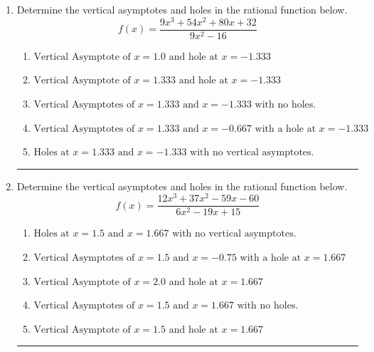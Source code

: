 \documentclass[14pt]{extbook}
\newcommand{\litem}[1]{\item#1\hspace*{-1cm}\rule{\textwidth}{0.4pt}}
\begin{document}
\begin{enumerate}
{\begin{enumerate}[label=\Alph*.]
\end{enumerate} }
\litem{
Determine the vertical asymptotes and holes in the rational function below.\[ f(x) = \frac{9x^{3} +54 x^{2} +80 x + 32}{9x^{2} -16} \]\begin{enumerate}[label=\Alph*.]
\item \( \text{Vertical Asymptote of } x = 1.0 \text{ and hole at } x = -1.333 \)
\item \( \text{Vertical Asymptote of } x = 1.333 \text{ and hole at } x = -1.333 \)
\item \( \text{Vertical Asymptotes of } x = 1.333 \text{ and } x = -1.333 \text{ with no holes.} \)
\item \( \text{Vertical Asymptotes of } x = 1.333 \text{ and } x = -0.667 \text{ with a hole at } x = -1.333 \)
\item \( \text{Holes at } x = 1.333 \text{ and } x = -1.333 \text{ with no vertical asymptotes.} \)

\end{enumerate} }
\litem{
Determine the vertical asymptotes and holes in the rational function below.\[ f(x) = \frac{12x^{3} +37 x^{2} -59 x -60}{6x^{2} -19 x + 15} \]\begin{enumerate}[label=\Alph*.]
\item \( \text{Holes at } x = 1.5 \text{ and } x = 1.667 \text{ with no vertical asymptotes.} \)
\item \( \text{Vertical Asymptotes of } x = 1.5 \text{ and } x = -0.75 \text{ with a hole at } x = 1.667 \)
\item \( \text{Vertical Asymptote of } x = 2.0 \text{ and hole at } x = 1.667 \)
\item \( \text{Vertical Asymptotes of } x = 1.5 \text{ and } x = 1.667 \text{ with no holes.} \)
\item \( \text{Vertical Asymptote of } x = 1.5 \text{ and hole at } x = 1.667 \)


\end{enumerate}}
\end{enumerate}
\end{document}
